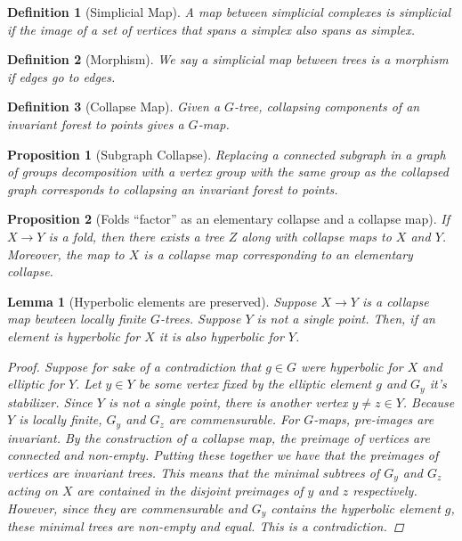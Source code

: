\documentclass{article}
\theoremstyle{mystyle}
\newtheorem{lem}{Lemma}[section]
\newtheorem{pro}{Proposition}
\newtheorem{defn}{Definition}
\theoremstyle{remark}
\begin{document}
\begin{defn}
    [Simplicial Map]
    A map between simplicial complexes is simplicial if the image of a set of vertices that spans a simplex also spans as simplex.
\end{defn}

\begin{defn}
    [Morphism]
    We say a simplicial map between trees is a morphism if edges go to edges.
\end{defn}

\begin{defn}
    [Collapse Map]
    Given a \(G\)-tree, collapsing components of an invariant forest to points gives a \(G\)-map.
\end{defn}
\begin{pro}
    [Subgraph Collapse]
    Replacing a connected subgraph in a graph of groups decomposition with a vertex group with the same group as the collapsed graph corresponds to collapsing an invariant forest to points.
\end{pro}

\begin{pro}
    [Folds ``factor'' as an elementary collapse and a collapse map]
    \label{pro:foldfactor} 
    If \(X \to Y\) is a fold, then there exists a tree \(Z\) along with collapse maps to \(X\) and
\(Y\). Moreover, the map to \(X\) is a collapse map corresponding to an elementary collapse.
\end{pro}

\begin{lem}
    [Hyperbolic elements are preserved]
    \label{lem:promoteelliptic} 
    Suppose \(X \to Y\) is a collapse map bewteen locally finite \(G\)-trees. Suppose \(Y\) is not a single point. Then, if an element is hyperbolic for \(X\) it is also hyperbolic for \(Y\).
    \begin{proof}
        Suppose for sake of a contradiction that \(g\in G\) were hyperbolic for \(X\) and elliptic for \(Y\). Let \(y \in Y\) be some vertex fixed by the elliptic element \(g\) and \(G_y\) it's stabilizer. Since \(Y\) is not a single point, there is another vertex \(y\neq z \in Y\). Because \(Y\) is locally finite, \(G_y\) and \(G_z\) are commensurable. For \(G\)-maps, pre-images are invariant. By the construction of a collapse map, the preimage of vertices are connected and non-empty. Putting these together we have that the preimages of vertices are invariant trees. This means that the minimal subtrees of \(G_y\) and \(G_z\) acting on \(X\) are contained in the disjoint preimages of \(y\) and \(z\) respectively. However, since they are commensurable and \(G_y\) contains the hyperbolic element \(g\), these minimal trees are non-empty and equal. This is a contradiction.
    \end{proof}
\end{lem}
\end{document}
